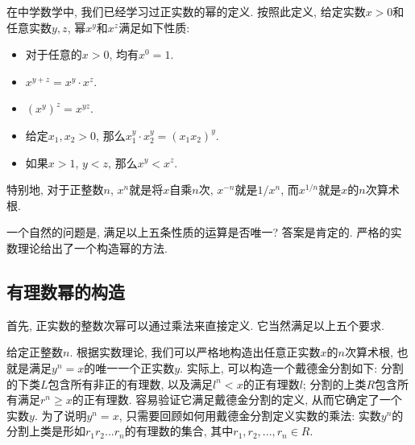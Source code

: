 

在中学数学中, 我们已经学习过正实数的幂的定义. 按照此定义, 给定实数$x>0$和任意实数$y,z$, 幂$x^y$和$x^z$满足如下性质:

\begin{itemize}
\item 对于任意的$x>0$, 均有$x^0=1$.
\item $x^{y+z}=x^y\cdot x^z$.
\item $(x^y)^z=x^{yz}$.
\item 给定$x_1,x_2>0$, 那么$x_1^y\cdot x_2^y=(x_1x_2)^y$.
\item 如果$x>1$, $y<z$, 那么$x^y<x^z$.
\end{itemize}

特别地, 对于正整数$n$, $x^n$就是将$x$自乘$n$次, $x^{-n}$就是$1/x^n$, 而$x^{1/n}$就是$x$的$n$次算术根. 

一个自然的问题是, 满足以上五条性质的运算是否唯一? 答案是肯定的. 严格的实数理论给出了一个构造幂的方法.

\subsection{有理数幂的构造}

首先, 正实数的整数次幂可以通过乘法来直接定义. 它当然满足以上五个要求.

给定正整数$n$. 根据实数理论, 我们可以严格地构造出任意正实数$x$的$n$次算术根, 也就是满足$y^n=x$的唯一一个正实数$y$. 实际上, 可以构造一个戴德金分割如下: 分割的下类$L$包含所有非正的有理数, 以及满足$l^n<x$的正有理数$l$; 分割的上类$R$包含所有满足$r^n\geq x$的正有理数. 容易验证它满足戴德金分割的定义, 从而它确定了一个实数$y$. 为了说明$y^n=x$, 只需要回顾如何用戴德金分割定义实数的乘法: 实数$y^n$的分割上类是形如$r_1r_2...r_n$的有理数的集合, 其中$r_1,r_2,...,r_n\in R$. 